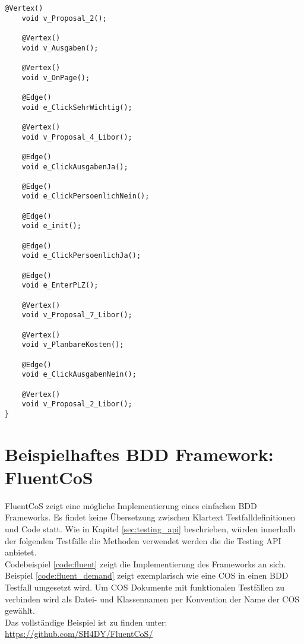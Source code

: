 \begin{lstlisting}[caption=ModellLogisch.java, label=code:gw_generated]
    @Vertex()
    void v_Proposal_2();

    @Vertex()
    void v_Ausgaben();

    @Vertex()
    void v_OnPage();

    @Edge()
    void e_ClickSehrWichtig();

    @Vertex()
    void v_Proposal_4_Libor();

    @Edge()
    void e_ClickAusgabenJa();

    @Edge()
    void e_ClickPersoenlichNein();

    @Edge()
    void e_init();

    @Edge()
    void e_ClickPersoenlichJa();

    @Edge()
    void e_EnterPLZ();

    @Vertex()
    void v_Proposal_7_Libor();

    @Vertex()
    void v_PlanbareKosten();

    @Edge()
    void e_ClickAusgabenNein();

    @Vertex()
    void v_Proposal_2_Libor();
}
\end{lstlisting}

\section{Beispielhaftes BDD Framework: FluentCoS}
\label{app:fluent}
FluentCoS zeigt eine mögliche Implementierung eines einfachen BDD Frameworks. Es findet keine Übersetzung zwischen Klartext Testfalldefinitionen und Code statt. Wie in Kapitel \ref{sec:testing_api} beschrieben, würden innerhalb der folgenden Testfälle die Methoden verwendet werden die die Testing API anbietet.\\

Codebeispiel \ref{code:fluent} zeigt die Implementierung des Frameworks an sich. Beispiel \ref{code:fluent_demand} zeigt exemplarisch wie eine \Gls{COS} in einen BDD Testfall umgesetzt wird. Um \Gls{COS} Dokumente mit funktionalen Testfällen zu verbinden wird als Datei- und Klassennamen per Konvention der Name der \Gls{COS} gewählt.\\

Das vollständige Beispiel ist zu finden unter: \url{https://github.com/SH4DY/FluentCoS/}

